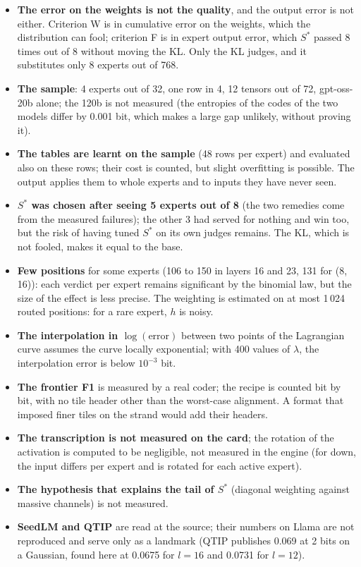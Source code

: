 \begin{faux}
\begin{itemize}
\item \textbf{The error on the weights is not the quality}, and the output error is not either. Criterion W is in cumulative error on the weights, which the distribution can fool; criterion F is in expert output error, which $S^{*}$ passed 8 times out of 8 without moving the KL. Only the KL judges, and it substitutes only 8 experts out of 768.
\item \textbf{The sample}: 4 experts out of 32, one row in 4, 12 tensors out of 72, gpt-oss-20b alone; the 120b is not measured (the entropies of the codes of the two models differ by 0.001 bit, which makes a large gap unlikely, without proving it).
\item \textbf{The tables are learnt on the sample} (48 rows per expert) and evaluated also on these rows; their cost is counted, but slight overfitting is possible. The output applies them to whole experts and to inputs they have never seen.
\item \textbf{$S^{*}$ was chosen after seeing 5 experts out of 8} (the two remedies come from the measured failures); the other 3 had served for nothing and win too, but the risk of having tuned $S^{*}$ on its own judges remains. The KL, which is not fooled, makes it equal to the base.
\item \textbf{Few positions} for some experts (106 to 150 in layers 16 and 23, 131 for (8, 16)): each verdict per expert remains significant by the binomial law, but the size of the effect is less precise. The weighting is estimated on at most 1\,024 routed positions: for a rare expert, $h$ is noisy.
\item \textbf{The interpolation in $\log(\text{error})$} between two points of the Lagrangian curve assumes the curve locally exponential; with 400 values of $\lambda$, the interpolation error is below $10^{-3}$ bit.
\item \textbf{The frontier F1} is measured by a real coder; the recipe is counted bit by bit, with no tile header other than the worst-case alignment. A format that imposed finer tiles on the strand would add their headers.
\item \textbf{The transcription is not measured on the card}; the rotation of the activation is computed to be negligible, not measured in the engine (for down, the input differs per expert and is rotated for each active expert).
\item \textbf{The hypothesis that explains the tail of $S^{*}$} (diagonal weighting against massive channels) is not measured.
\item \textbf{SeedLM and QTIP} are read at the source; their numbers on Llama are not reproduced and serve only as a landmark (QTIP publishes 0.069 at 2 bits on a Gaussian, found here at 0.0675 for $l = 16$ and 0.0731 for $l = 12$).
\end{itemize}
\end{faux}
